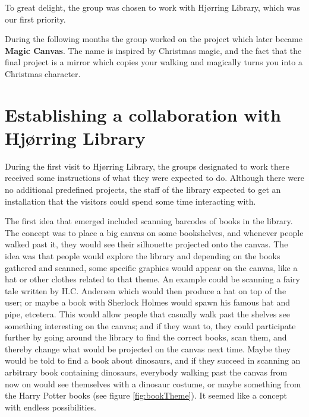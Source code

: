 To great delight, the group was chosen to work with Hj{\o}rring Library, which was our first priority.

During the following months the group worked on the project which later became \textbf{Magic Canvas}. The name is inspired by Christmas magic, and the fact that the final project is a mirror which copies your walking and magically turns you into a Christmas character.

\section{Establishing a collaboration with Hj{\o}rring Library}


During the first visit to Hj{\o}rring Library, the groups designated to work there received some instructions of what they were expected to do. Although there were no additional predefined projects, the staff of the library expected to get an installation that the visitors could spend some time interacting with.

The first idea that emerged included scanning barcodes of books in the library. The concept was to place a big canvas on some bookshelves, and whenever people walked past it, they would see their silhouette projected onto the canvas. The idea was that people would explore the library and depending on the books gathered and scanned, some specific graphics would appear on the canvas, like a hat or other clothes related to that theme. An example could be scanning a fairy tale written by H.C. Andersen which would then produce a hat on top of the user; or maybe a book with Sherlock Holmes would spawn his famous hat and pipe, etcetera. This would allow people that casually walk past the shelves see something interesting on the canvas; and if they want to, they could participate further by going around the library to find the correct books, scan them, and thereby change what would be projected on the canvas next time. Maybe they would be told to find a book about dinosaurs, and if they succeed in scanning an arbitrary book containing dinosaurs, everybody walking past the canvas from now on would see themselves with a dinosaur costume, or maybe something from the Harry Potter books (see figure \ref{fig:bookTheme}). It seemed like a concept with endless possibilities.

